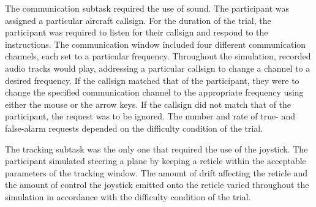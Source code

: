 \documentclass[11pt]{article}
\begin{document}
	The communication subtask required the use of sound. The participant was assigned a particular aircraft callsign. For the duration of the trial, the participant was required to listen for their callsign and respond to the instructions. The communication window included four different communication channels, each set to a particular frequency. Throughout the simulation, recorded audio tracks would play, addressing a particular callsign to change a channel to a desired frequency. If the callsign matched that of the participant, they were to change the specified communication channel to the appropriate frequency using either the mouse or the arrow keys. If the callsign did not match that of the participant, the request was to be ignored. The number and rate of true- and false-alarm requests depended on the difficulty condition of the trial.
	
	The tracking subtask was the only one that required the use of the joystick. The participant simulated steering a plane by keeping a reticle within the acceptable parameters of the tracking window. The amount of drift affecting the reticle and the amount of control the joystick emitted onto the reticle varied throughout the simulation in accordance with the difficulty condition of the trial. 
	
	\begin{table}[]
	\centering
	\caption[Multi-Attribute Task Battery (MATB) Load Condition Parameters]{Parameters used in MATB script generator specifying subtask difficulty and event occurrences per 10-minute trial}
	
	\label{tab:matb-params}
	\end{table}
	
\end{document}
